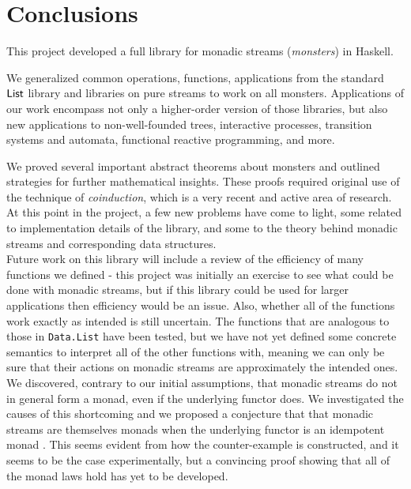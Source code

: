 \section{Conclusions}

This project developed a full library for monadic streams ({\em monsters}) in Haskell.

We generalized common operations, functions, applications from the standard $\mathsf{List}$ library and libraries on pure streams to work on all monsters.
Applications of our work encompass not only a higher-order version of those libraries, but also new applications to non-well-founded trees, interactive processes, transition systems and automata, functional reactive programming, and more.

We proved several important abstract theorems about monsters and outlined strategies for further mathematical insights.
These proofs required original use of the technique of {\em coinduction}, which is a very recent and active area of research. \\

At this point in the project, a few new problems have come to light, some related to implementation details of the library, and some to the theory behind monadic streams and corresponding data structures. \\

Future work on this library will include a review of the efficiency of many functions we defined - this project was initially an exercise to see what could be done with monadic streams, but if this library could be used for larger applications then efficiency would be an issue. Also, whether all of the functions work exactly as intended is still uncertain. The functions that are analogous to those in \verb+Data.List+ have been tested, but we have not yet defined some concrete semantics to interpret all of the other functions with, meaning we can only be sure that their actions on monadic streams are approximately the intended ones. \\

We discovered, contrary to our initial assumptions, that monadic streams do not in general form a monad, even if the underlying functor does.
We investigated the causes of this shortcoming and we proposed a conjecture that
that monadic streams are themselves monads when the underlying functor is an idempotent monad \cite{idempotent_monads}. This seems evident from how the counter-example is constructed, and it seems to be the case experimentally, but a convincing proof showing that all of the monad laws hold has yet to be developed. 

